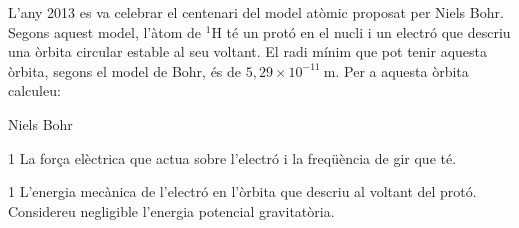 L'any 2013 es va celebrar el centenari del model atòmic proposat per Niels Bohr. Segons aquest model, l'àtom de $^{1}$H té un protó en el nucli i un electró que descriu una òrbita circular estable al seu voltant. El radi mínim que pot tenir aquesta òrbita, segons el model de Bohr, és de $5,29\times 10^{-11}\ \mathrm{m}$. Per a aquesta òrbita calculeu:

{\centering Niels Bohr\par}

\begin{apartat}{1}
La força elèctrica que actua sobre l'electró i la freqüència de gir que té.
\end{apartat}

\begin{apartat}{1}
L'energia mecànica de l'electró en l'òrbita que descriu al voltant del protó. Considereu negligible l'energia potencial gravitatòria.
\end{apartat}

